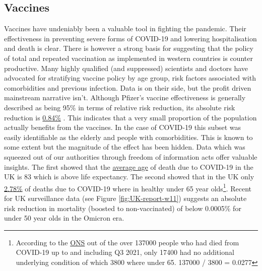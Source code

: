 \documentclass[11pt,a4paper,notitlepage]{report}
\begin{document}
\subsection*{Vaccines}

Vaccines have undeniably been a valuable tool in fighting the pandemic. Their effectiveness in preventing severe forms of COVID-19 and lowering hospitalisation and death is clear. There is however a strong basis for suggesting that the policy of total and repeated vaccination as implemented in western countries is counter productive. Many highly qualified (and suppressed) scientists and doctors have advocated for stratifying vaccine policy by age group, risk factors associated with comorbidities and previous infection. Data is on their side, but the profit driven mainstream narrative isn't. Although Pfizer's vaccine effectiveness is generally described as being 95\% in terms of relative risk reduction, its absolute risk reduction is \href{https://www.thelancet.com/journals/lanmic/article/PIIS2666-5247(21)00069-0/fulltext}{0.84\%} \cite{lancet20042021}. This indicates that a very small proportion of the population actually benefits from the vaccines. In the case of COVID-19 this subset was easily identifiable as the elderly and people with comorbidities. This is known to some extent but the magnitude of the effect has been hidden. Data which was squeezed out of our authorities through freedom of information acts offer valuable insights. The first showed that the \href{https://www.ons.gov.uk/aboutus/transparencyandgovernance/freedomofinformationfoi/averageageofthosewhohaddiedwithcovid19}{average age} of death due to COVID-19 in the UK is 83 \cite{freedomofinformationfoi11012021} which is above life expectancy. The second showed that in the UK only \href{https://www.ons.gov.uk/aboutus/transparencyandgovernance/freedomofinformationfoi/deathsfromcovid19withnootherunderlyingcauses}{2.78\%} \cite{freedomofinformationfoi16122021} of deaths due to COVID-19 where in healthy under 65 year olds\footnote{According to the \href{https://www.ons.gov.uk/aboutus/transparencyandgovernance/freedomofinformationfoi/deathsfromcovid19withnootherunderlyingcauses}{ONS} \cite{freedomofinformationfoi16122021} out of the over 137000 people who had died from COVID-19 up to and including Q3 2021, only 17400 had no additional underlying condition of which 3800 where under 65. 137000 / 3800 = 0.0277}. Recent  for UK surveillance data (see Figure \ref{fig:UK-report-w11}) suggests an absolute risk reduction in mortality (boosted to non-vaccinated) of below 0.0005\% for under 50 year olds in the Omicron era.
\end{document}
